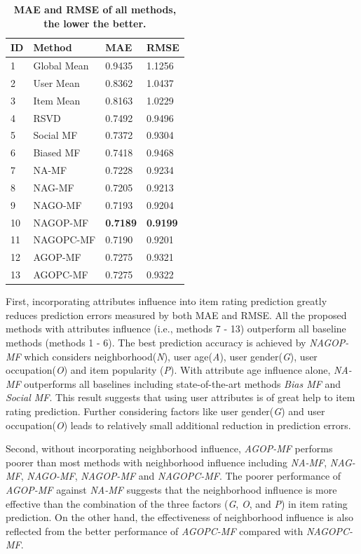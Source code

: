 \documentclass{llncs}
\begin{document}
	\begin{table}
		\centering
		\caption{\textbf{MAE and RMSE of all methods, the lower the better.}}
		\begin{tabular}{llll}\hline
			ID & Method & MAE & RMSE \\\hline
			1 &Global Mean &0.9435 &1.1256\\
			2 &User Mean &0.8362 &1.0437\\
			3 &Item Mean &0.8163 &1.0229\\
			4 &RSVD &0.7492 &0.9496\\
			5 &Social MF &0.7372 &0.9304\\
			6 &Biased MF &0.7418 &0.9468\\ \hline
			7 &NA-MF &0.7228 &0.9234\\
			8 &NAG-MF &0.7205 &0.9213\\
			9 &NAGO-MF &0.7193 &0.9204\\
			10 &NAGOP-MF & \textbf{0.7189} &\textbf{0.9199}\\
			11 &NAGOPC-MF &0.7190 &0.9201\\\hline
			12 &AGOP-MF &0.7275 &0.9321\\
			13 &AGOPC-MF &0.7275 &0.9322\\\hline
		\end{tabular}
	\end{table}
	
	
	First, incorporating attributes influence into item rating prediction greatly reduces prediction errors measured
	by both MAE and RMSE. All the proposed methods with attributes influence (i.e., methods 7 - 13) outperform
	all baseline methods (methods 1 - 6). The best prediction accuracy
	is achieved by \emph{NAGOP-MF} which considers neighborhood(\emph{N}), user age(\emph{A}), user gender(\emph{G}), user occupation(\emph{O}) and item
	popularity (\emph{P}). With attribute age influence alone, \emph{NA-MF} outperforms all baselines including state-of-the-art methods \emph{Bias MF} and \emph{Social MF}.
	This result suggests that using user attributes is of great help to item rating prediction.
	Further considering factors like user gender(\emph{G}) and user occupation(\emph{O}) leads to relatively small additional reduction in prediction errors.
	
	Second, without incorporating neighborhood influence, \emph{AGOP-MF}
	performs poorer than most methods with neighborhood influence including \emph{NA-MF}, \emph{NAG-MF}, \emph{NAGO-MF}, \emph{NAGOP-MF} and \emph{NAGOPC-MF}.
	The poorer performance of \emph{AGOP-MF} against \emph{NA-MF} suggests
	that the neighborhood influence is more effective than
	the combination of the three factors (\emph{G}, \emph{O}, and \emph{P}) in item rating
	prediction.
	On the other hand, the effectiveness
	of neighborhood influence is also reflected from the
	better performance of \emph{AGOPC-MF} compared with \emph{NAGOPC-MF}.
	
\end{document}
